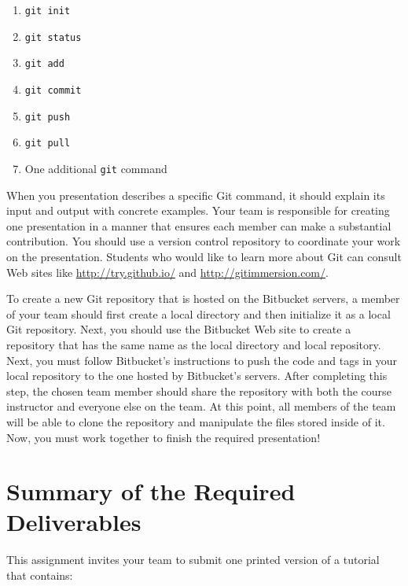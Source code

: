 \begin{enumerate} 
			
	\item {\tt git init}

	\item {\tt git status}

	\item {\tt git add} 

	\item {\tt git commit}

	\item {\tt git push}

	\item {\tt git pull} 

	\item One additional {\tt git} command

\end{enumerate}

When you presentation describes a specific Git command, it should explain its input and output with concrete examples.
Your team is responsible for creating one presentation in a manner that ensures each member can make a substantial
contribution. You should use a version control repository to coordinate your work on the presentation.  Students who
would like to learn more about Git can consult Web sites like \url{http://try.github.io/} and
\url{http://gitimmersion.com/}. 

To create a new Git repository that is hosted on the Bitbucket servers, a member of your team should first create a
local directory and then initialize it as a local Git repository.  Next, you should use the Bitbucket
Web site to create a repository that has the same name as the local directory and local repository.  Next, you must
follow Bitbucket's instructions to push the code and tags in your local repository to the one hosted by Bitbucket's
servers.  After completing this step, the chosen team member should share the repository with both the course instructor
and everyone else on the team.  At this point, all members of the team will be able to clone the repository and
manipulate the files stored inside of it.  Now, you must work together to finish the required presentation!

\section*{Summary of the Required Deliverables}

This assignment invites your team to submit one printed version of a tutorial that contains:

